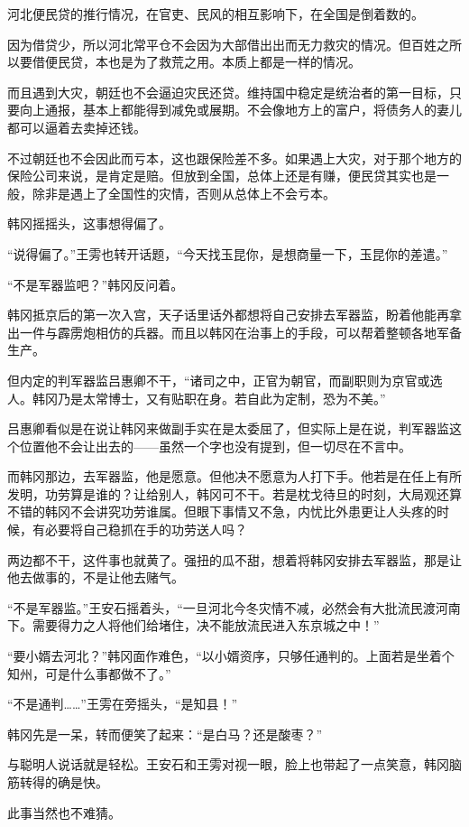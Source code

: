 河北便民贷的推行情况，在官吏、民风的相互影响下，在全国是倒着数的。

因为借贷少，所以河北常平仓不会因为大部借出出而无力救灾的情况。但百姓之所以要借便民贷，本也是为了救荒之用。本质上都是一样的情况。

而且遇到大灾，朝廷也不会逼迫灾民还贷。维持国中稳定是统治者的第一目标，只要向上通报，基本上都能得到减免或展期。不会像地方上的富户，将债务人的妻儿都可以逼着去卖掉还钱。

不过朝廷也不会因此而亏本，这也跟保险差不多。如果遇上大灾，对于那个地方的保险公司来说，是肯定是赔。但放到全国，总体上还是有赚，便民贷其实也是一般，除非是遇上了全国性的灾情，否则从总体上不会亏本。

韩冈摇摇头，这事想得偏了。

“说得偏了。”王雱也转开话题，“今天找玉昆你，是想商量一下，玉昆你的差遣。”

“不是军器监吧？”韩冈反问着。

韩冈抵京后的第一次入宫，天子话里话外都想将自己安排去军器监，盼着他能再拿出一件与霹雳炮相仿的兵器。而且以韩冈在治事上的手段，可以帮着整顿各地军备生产。

但内定的判军器监吕惠卿不干，“诸司之中，正官为朝官，而副职则为京官或选人。韩冈乃是太常博士，又有贴职在身。若自此为定制，恐为不美。”

吕惠卿看似是在说让韩冈来做副手实在是太委屈了，但实际上是在说，判军器监这个位置他不会让出去的——虽然一个字也没有提到，但一切尽在不言中。

而韩冈那边，去军器监，他是愿意。但他决不愿意为人打下手。他若是在任上有所发明，功劳算是谁的？让给别人，韩冈可不干。若是枕戈待旦的时刻，大局观还算不错的韩冈不会讲究功劳谁属。但眼下事情又不急，内忧比外患更让人头疼的时候，有必要将自己稳抓在手的功劳送人吗？

两边都不干，这件事也就黄了。强扭的瓜不甜，想着将韩冈安排去军器监，那是让他去做事的，不是让他去赌气。

“不是军器监。”王安石摇着头，“一旦河北今冬灾情不减，必然会有大批流民渡河南下。需要得力之人将他们给堵住，决不能放流民进入东京城之中！”

“要小婿去河北？”韩冈面作难色，“以小婿资序，只够任通判的。上面若是坐着个知州，可是什么事都做不了。”

“不是通判……”王雱在旁摇头，“是知县！”

韩冈先是一呆，转而便笑了起来：“是白马？还是酸枣？”

与聪明人说话就是轻松。王安石和王雱对视一眼，脸上也带起了一点笑意，韩冈脑筋转得的确是快。

此事当然也不难猜。

